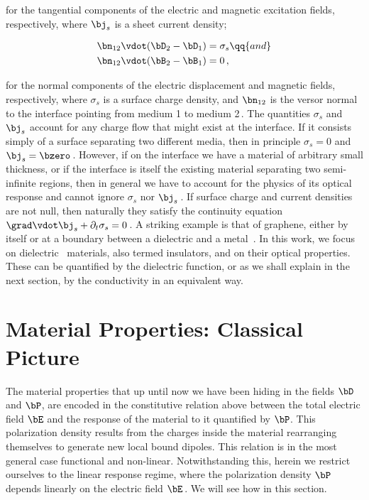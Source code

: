\noindent for the tangential components of the electric and magnetic excitation fields, respectively, where $\bj_s$ is a sheet current density;

\begin{subequations}
    \label{eq:boundary_conditions_perpendicular}
    \begin{align}
        \bn_{12} \vdot (\bD_2 - \bD_1) &= \sigma_s \label{eq:boundary_condition_D} \qq{and}\\
        \bn_{12} \vdot (\bB_2 - \bB_1) &= 0\,, \label{eq:boundary_condition_B}
    \end{align}
\end{subequations}


\noindent for the normal components of the electric displacement and magnetic fields, respectively, where $\sigma_s$ is a surface charge density, and $\bn_{12}$ is the versor normal to the interface pointing from medium 1 to medium 2\,.
The quantities $\sigma_s$ and $\bj_s$ account for any charge flow that might exist at the interface.
If it consists simply of a surface separating two different media, then in principle $\sigma_s = 0$ and $\bj_s = \bzero$\,.
However, if on the interface we have a material of arbitrary small thickness, or if the interface is itself the existing material separating two semi-infinite regions, then in general we have to account for the physics of its optical response and cannot ignore $\sigma_s$ nor $\bj_s$\,.
If surface charge and current densities are not null, then naturally they satisfy the continuity equation $\grad \vdot \bj_s + \partial_t \sigma_s = 0$\,.
A striking example is that of graphene, either by itself or at a boundary between a dielectric and a metal~\cite{GoncalvesPeres:2016}.
In this work, we focus on dielectric \bd~materials, also termed insulators, and on their optical properties.
These can be quantified by the dielectric function, or as we shall explain in the next section, by the conductivity in an equivalent way.

\section{Material Properties: Classical Picture}
\label{sec:dielectric_function_classical}

The material properties that up until now we have been hiding in the fields $\bD$ and $\bP$, are encoded in the constitutive relation above between the total electric field $\bE$ and the response of the material to it quantified by $\bP$.
This polarization density results from the charges inside the material rearranging themselves to generate new local bound dipoles.
This relation is in the most general case functional and non-linear.
Notwithstanding this, herein we restrict ourselves to the linear response regime, where the polarization density $\bP$ depends linearly on the electric field $\bE$\,.
We will see how in this section.

